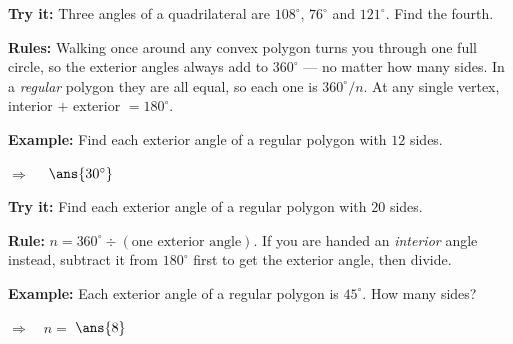 \documentclass[12pt]{article}
\begin{document}
\begin{tryitbox}
\textbf{Try it:} \quad Three angles of a quadrilateral are $108^\circ$, $76^\circ$ and $121^\circ$. Find the fourth.\\[2pt]
\end{tryitbox}


\begin{formulabox}
\textbf{Rules:} Walking once around any convex polygon turns you through one full circle, so the exterior angles always add to $360^\circ$ --- no matter how many sides. In a \emph{regular} polygon they are all equal, so each one is $360^\circ / n$. At any single vertex, interior $+$ exterior $= 180^\circ$.
\end{formulabox}

\begin{examplebox}
\textbf{Example:} \quad Find each exterior angle of a regular polygon with $12$ sides.

$\Rightarrow\quad$ $\ans{30^\circ}$
\end{examplebox}

\begin{tryitbox}
\textbf{Try it:} \quad Find each exterior angle of a regular polygon with $20$ sides.\\[2pt]
\end{tryitbox}


\begin{formulabox}
\textbf{Rule:} $n = 360^\circ \div (\text{one exterior angle})$. If you are handed an \emph{interior} angle instead, subtract it from $180^\circ$ first to get the exterior angle, then divide.
\end{formulabox}

\begin{examplebox}
\textbf{Example:} \quad Each exterior angle of a regular polygon is $45^\circ$. How many sides?

$\Rightarrow\quad n = $ $\ans{8}$
\end{examplebox}
\end{document}

